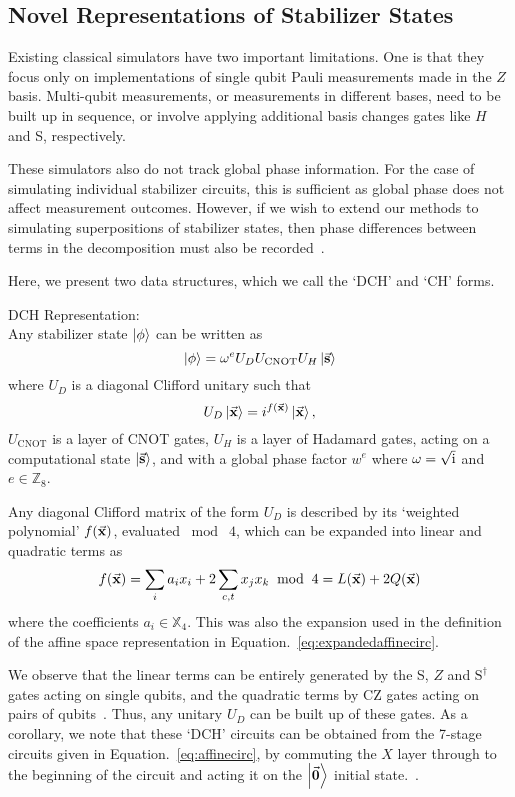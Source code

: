 \subsection{Novel Representations of Stabilizer States}
Existing classical simulators have two important limitations. One is that they focus only on implementations of single qubit Pauli measurements made in the $Z$ basis. Multi-qubit measurements, or measurements in different bases, need to be built up in sequence, or involve applying additional basis changes gates like $H$ and S, respectively.\par
These simulators also do not track global phase information. For the case of simulating individual stabilizer circuits, this is sufficient as global phase does not affect measurement outcomes. However, if we wish to extend our methods to simulating superpositions of stabilizer states, then phase differences between terms in the decomposition must also be recorded~\cite{Garcia2015}.\par
Here, we present two data structures, which we call the `DCH' and `CH' forms.
\begin{defn}
DCH Representation:\\
Any stabilizer state $\ket{\phi}$ can be written as
\begin{equation}\ket{\phi} = \omega^{e}U_{D} U_{\text{CNOT}} U_{H} \ket{\va{s}}
\label{eq:dch}
\end{equation}
where $U_{D}$ is a diagonal Clifford unitary such that
\[
U_{D}\ket{\va{x}} = i^{f(\va{x})}\ket{\va{x}},
\]
$U_{\text{CNOT}}$ is a layer of CNOT gates, $U_{H}$ is a layer of Hadamard gates, acting on a computational state $\ket{\va{s}}$, and with a global phase factor $w^{e}$ where $\omega=\sqrt{\mathrm{i}}$ and $e\in\mathbb{Z}_{8}$.\label{def:dch}
\end{defn}
Any diagonal Clifford matrix of the form $U_{D}$ is described by its `weighted polynomial' $f(\va{x})$, evaluated $\bmod\; 4$, which can be expanded into linear and quadratic terms as~\cite{VandenNest2008,Campbell2016}
\[
    f(\va{x}) = \sum_{i}a_{i}x_{i} + 2\sum_{c,t}x_{j}x_{k}\;\bmod\;4 = L(\va{x}) + 2Q(\va{x})
\]
where the coefficients $a_{i}\in\mathbb{X}_{4}$. This was also the expansion used in the definition of the affine space representation in Equation.~\ref{eq:expandedaffinecirc}.\par
We observe that the linear terms can be entirely generated by the S, $Z$ and $\text{S}^{\dagger}$ gates acting on single qubits, and the quadratic terms by CZ gates acting on pairs of qubits~\cite{Campbell2016}. Thus, any unitary $U_{D}$ can be built up of these gates. As a corollary, we note that these `DCH' circuits can be obtained from the 7-stage circuits given in Equation.~\ref{eq:affinecirc}, by commuting the $X$ layer through to the beginning of the circuit and acting it on the $\ket{\va{0}}$ initial state.~\cite{VandenNest2008}.\par
